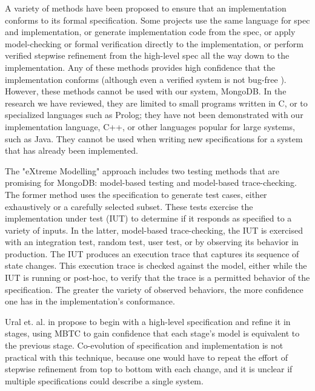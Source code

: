\documentclass{vldb}
\begin{document}
A variety of methods have been proposed to ensure that an implementation conforms to its formal specification.
Some projects use the same language for spec and implementation\cite{KerGre99},
or generate implementation code from the spec\cite{Houhou17CodeGenerationFromSpecification},
or apply model-checking or formal verification directly to the implementation\cite{Holzmann04ModelDrivenVerification},
or perform verified stepwise refinement from the high-level spec all the way down to the implementation\cite{Eiriksson95UsingFormalVerification}.
Any of these methods provides high confidence that the implementation conforms (although even a verified system is not bug-free \cite{Fonseca17EmpiricalStudy}). 
However, these methods cannot be used with our system, MongoDB.
In the research we have reviewed, they are limited to small programs written in C, or to specialized languages such as Prolog; they have not been demonstrated with our implementation language, C++, or other languages popular for large systems, such as Java.
They cannot be used when writing new specifications for a system that has already been implemented.

The "eXtreme Modelling" approach includes two testing methods that are promising for MongoDB: model-based testing\cite{Utting06PracticalModelBasedTesting} and model-based trace-checking\cite{Jard83AnApproachToTestingSpecifications, MBTC}. The former method uses the specification to generate test cases, either exhaustively or a carefully selected subset\cite{Dick93AutomatingGenerationOfTests}.
These tests exercise the implementation under test (IUT) to determine if it responds as specified to a variety of inputs.
In the latter, model-based trace-checking, the IUT is exercised with an integration test, random test, user test, or by observing its behavior in production.
The IUT produces an execution trace that captures its sequence of state changes.
This execution trace is checked against the model, either while the IUT is running or post-hoc, to verify that the trace is a permitted behavior of the specification.
The greater the variety of observed behaviors, the more confidence one has in the implementation's conformance.

Ural et. al. in \cite{Ural84AutomatedTestingOfProtocolSpecifications} propose to begin with a high-level specification and refine it in stages, using MBTC to gain confidence that each stage's model is equivalent to the previous stage.
Co-evolution of specification and implementation is not practical with this technique, because one would have to repeat the effort of stepwise refinement from top to bottom with each change, and it is unclear if multiple specifications could describe a single system.
\end{document}
